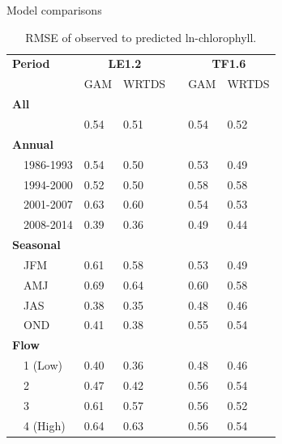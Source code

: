 \documentclass[serif]{beamer}\usepackage[]{graphicx}\usepackage[]{color}
\begin{document}
\begin{frame}{Model comparisons}
\scriptsize
\begin{table}[!tbp]
\caption{RMSE of observed to predicted ln-chlorophyll.\label{tab:perftoobs}} 
\begin{center}
\begin{tabular}{lllcll}
\hline\hline
\multicolumn{1}{l}{\bfseries Period}&\multicolumn{2}{c}{\bfseries LE1.2}&\multicolumn{1}{c}{\bfseries }&\multicolumn{2}{c}{\bfseries TF1.6}\tabularnewline
\cline{2-3} \cline{5-6}
\multicolumn{1}{l}{}&\multicolumn{1}{c}{GAM}&\multicolumn{1}{c}{WRTDS}&\multicolumn{1}{c}{}&\multicolumn{1}{c}{GAM}&\multicolumn{1}{c}{WRTDS}\tabularnewline
\hline
{\bfseries All}&&&&&\tabularnewline
~~&0.54&0.51&&0.54&0.52\tabularnewline
\hline
{\bfseries Annual}&&&&&\tabularnewline
~~1986-1993&0.54&0.50&&0.53&0.49\tabularnewline
~~1994-2000&0.52&0.50&&0.58&0.58\tabularnewline
~~2001-2007&0.63&0.60&&0.54&0.53\tabularnewline
~~2008-2014&0.39&0.36&&0.49&0.44\tabularnewline
\hline
{\bfseries Seasonal}&&&&&\tabularnewline
~~JFM&0.61&0.58&&0.53&0.49\tabularnewline
~~AMJ&0.69&0.64&&0.60&0.58\tabularnewline
~~JAS&0.38&0.35&&0.48&0.46\tabularnewline
~~OND&0.41&0.38&&0.55&0.54\tabularnewline
\hline
{\bfseries Flow}&&&&&\tabularnewline
~~1 (Low)&0.40&0.36&&0.48&0.46\tabularnewline
~~2&0.47&0.42&&0.56&0.54\tabularnewline
~~3&0.61&0.57&&0.56&0.52\tabularnewline
~~4 (High)&0.64&0.63&&0.56&0.54\tabularnewline
\hline
\end{tabular}\end{center}

\end{table}

\end{frame}
\end{document}
